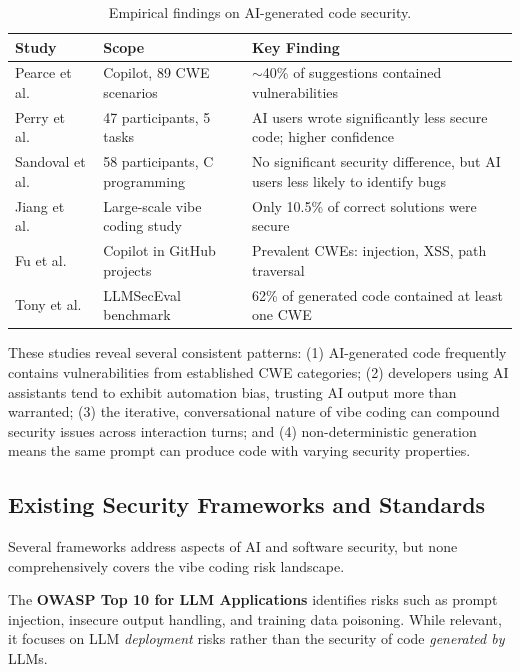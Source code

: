 \documentclass[preprint,review,12pt]{elsarticle}
\begin{document}
\begin{table}[t]
\centering
\caption{Empirical findings on AI-generated code security.}
\label{tab:empirical_security}
\footnotesize
\begin{tabular}{p{3cm} p{4cm} p{4cm}}
\toprule
\textbf{Study} & \textbf{Scope} & \textbf{Key Finding} \\
\midrule
Pearce et al.\ \cite{pearce2022asleep} & Copilot, 89 CWE scenarios & $\sim$40\% of suggestions contained vulnerabilities \\
Perry et al.\ \cite{perry2023users} & 47 participants, 5 tasks & AI users wrote significantly less secure code; higher confidence \\
Sandoval et al.\ \cite{sandoval2023lost} & 58 participants, C programming & No significant security difference, but AI users less likely to identify bugs \\
Jiang et al.\ \cite{jiang2025vibecoding} & Large-scale vibe coding study & Only 10.5\% of correct solutions were secure \\
Fu et al.\ \cite{fu2023security} & Copilot in GitHub projects & Prevalent CWEs: injection, XSS, path traversal \\
Tony et al.\ \cite{tony2023llmseceval} & LLMSecEval benchmark & 62\% of generated code contained at least one CWE \\
\bottomrule
\end{tabular}
\end{table}

These studies reveal several consistent patterns: (1) AI-generated code frequently contains vulnerabilities from established CWE categories; (2) developers using AI assistants tend to exhibit automation bias, trusting AI output more than warranted; (3) the iterative, conversational nature of vibe coding can compound security issues across interaction turns; and (4) non-deterministic generation means the same prompt can produce code with varying security properties.

\subsection{Existing Security Frameworks and Standards}
\label{subsec:frameworks}

Several frameworks address aspects of AI and software security, but none comprehensively covers the vibe coding risk landscape.

The \textbf{OWASP Top 10 for LLM Applications} \cite{owasp2025llm} identifies risks such as prompt injection, insecure output handling, and training data poisoning. While relevant, it focuses on LLM \textit{deployment} risks rather than the security of code \textit{generated by} LLMs.
\end{document}
